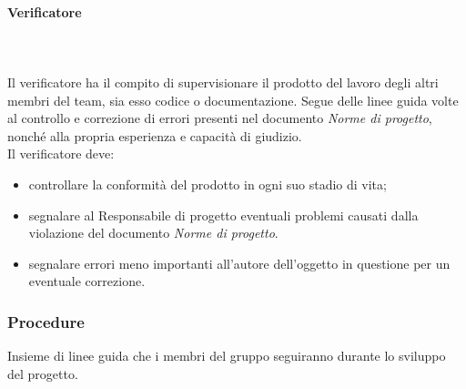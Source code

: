 			\paragraph{Verificatore} \mbox{}\\ \mbox{}\\
			Il verificatore ha il compito di supervisionare il prodotto del lavoro degli altri membri del team, sia esso codice o documentazione. Segue delle linee guida volte al controllo e correzione di errori presenti nel documento \textit{Norme di progetto}, nonché alla propria esperienza e capacità di giudizio.\\
			Il verificatore deve:
			\begin{itemize}
				\item controllare la conformità del prodotto in ogni suo stadio di vita;
				\item segnalare al Responsabile di progetto eventuali problemi causati dalla violazione del documento \textit{Norme di progetto}.
				\item segnalare errori meno importanti all'autore dell'oggetto in questione per un eventuale correzione.
							\end{itemize}
		\subsubsection{Procedure}
		Insieme di linee guida che i membri del gruppo seguiranno durante lo sviluppo del progetto.
